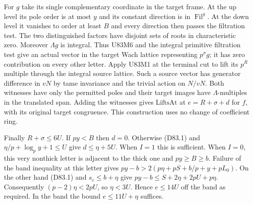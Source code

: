 For $g$ take its single complementary coordinate in the target
frame. At the up level its pole order is at most $y$ and its
constant direction is in $\operatorname{Fil}^{y}$. At the down
level it vanishes to order at least $B$ and every direction
then passes the filtration test. The two distinguished factors
have disjoint sets of roots in characteristic zero. Moreover
$\Lambda g$ is integral. Thus U83M6 and the integral primitive
filtration test give an actual vector in the target Wach lattice
representing $p^\sigma g$; it has zero contribution on every
other letter. Apply U83M1 at the terminal cut to lift its
$p^R$ multiple through the integral source lattice. Such a
source vector has generator difference in $vN$ by tame
invariance and the trivial action on $N/vN$. Both witnesses
have only the permitted poles and their target images have
$\Lambda$-multiples in the translated span. Adding the witnesses
gives $\mathrm{LiftsAt}$ at $e=R+\sigma+d$ for $f$, with its
original target congruence. This construction uses no change
of coefficient ring.

Finally $R+\sigma\le6U$. If $py<B$ then $d=0$. Otherwise
(D83.1) and $\eta/p+\log_p y+1\le U$ give $d\le\eta+5U$.
When $I=1$ this is sufficient. When $I=0$, this very nonthick
letter is adjacent to the thick one and $py\ge B\ge b$.
Failure of the band inequality at this letter gives
$py-b>2(p\eta+pS+b/p+y+pL_0)$.
On the other hand (D83.1) and $s_c\le b+\eta$ give
$py-b\le S+2\eta+2pU+p\eta$.
Consequently $(p-2)\eta<2pU$, so $\eta<3U$. Hence
$e\le14U$ off the band as required. In the band the bound
$e\le11U+\eta$ suffices.

